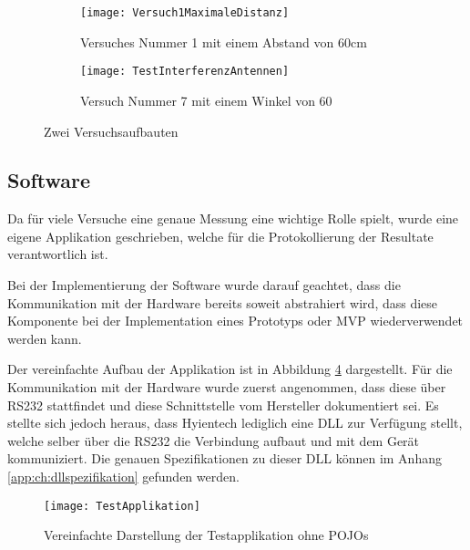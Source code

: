 \begin{figure}[htb]
	\begin{subfigure}{.5\linewidth}
		\texttt{[image: Versuch1MaximaleDistanz]}
		\caption{Versuches Nummer 1 mit einem Abstand von 60cm}
		\label{fig:versuchaufbaunmr1}
	\end{subfigure}\hfill%
	\begin{subfigure}{.35\linewidth}
		\centering
		\texttt{[image: TestInterferenzAntennen]}
		\caption{Versuch Nummer 7 mit einem Winkel von 60\SIUnitSymbolDegree}
		\label{fig:versuchaufbaunmr7}
	\end{subfigure}
	\caption{Zwei Versuchsaufbauten}
	\label{fig:versuchsaufbauten}
\end{figure}


\subsection{Software}
Da für viele Versuche eine genaue Messung eine wichtige Rolle spielt, wurde eine eigene Applikation geschrieben, welche für die Protokollierung der Resultate verantwortlich ist.

Bei der Implementierung der Software wurde darauf geachtet, dass die Kommunikation mit der Hardware bereits soweit abstrahiert wird, dass diese Komponente bei der Implementation eines Prototyps oder MVP wiederverwendet werden kann.

Der vereinfachte Aufbau der Applikation ist in Abbildung \ref{fig:test_applikation_aufbau} dargestellt. Für die Kommunikation mit der Hardware wurde zuerst angenommen, dass diese über RS232 stattfindet und diese Schnittstelle vom Hersteller dokumentiert sei. Es stellte sich jedoch heraus, dass Hyientech lediglich eine DLL zur Verfügung stellt, welche selber über die RS232 die Verbindung aufbaut und mit dem Gerät kommuniziert. Die genauen Spezifikationen zu dieser DLL können im Anhang \ref{app:ch:dllspezifikation} gefunden werden.

\begin{figure}[htb]
	\centering
	\texttt{[image: TestApplikation]}
	\caption{Vereinfachte Darstellung der Testapplikation ohne POJOs}
	\label{fig:test_applikation_aufbau}
\end{figure}
 
